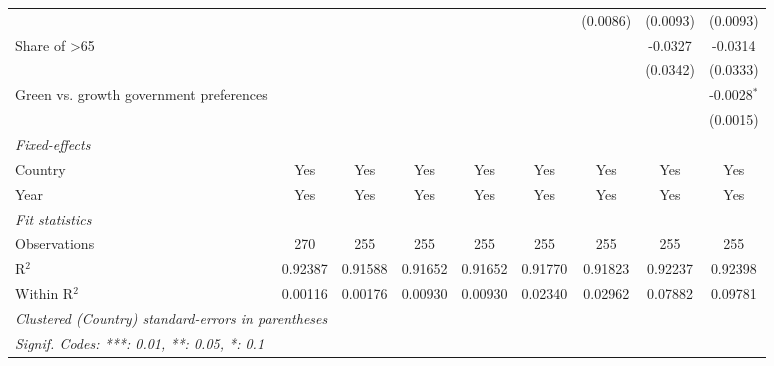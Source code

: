 \begin{table}[htbp]
\begin{tabular}{lcccccccc}
                                                       &          &          &          &          &          & (0.0086) & (0.0093) & (0.0093)\\   
      Share of >65                                     &          &          &          &          &          &          & -0.0327  & -0.0314\\   
                                                       &          &          &          &          &          &          & (0.0342) & (0.0333)\\   
      Green vs. growth government preferences          &          &          &          &          &          &          &          & -0.0028$^{*}$\\   
                                                       &          &          &          &          &          &          &          & (0.0015)\\   
      \midrule
      \emph{Fixed-effects}\\
      Country                                          & Yes      & Yes      & Yes      & Yes      & Yes      & Yes      & Yes      & Yes\\  
      Year                                             & Yes      & Yes      & Yes      & Yes      & Yes      & Yes      & Yes      & Yes\\  
      \midrule
      \emph{Fit statistics}\\
      Observations                                     & 270      & 255      & 255      & 255      & 255      & 255      & 255      & 255\\  
      R$^2$                                            & 0.92387  & 0.91588  & 0.91652  & 0.91652  & 0.91770  & 0.91823  & 0.92237  & 0.92398\\  
      Within R$^2$                                     & 0.00116  & 0.00176  & 0.00930  & 0.00930  & 0.02340  & 0.02962  & 0.07882  & 0.09781\\  
      \midrule \midrule
      \multicolumn{9}{l}{\emph{Clustered (Country) standard-errors in parentheses}}\\
      \multicolumn{9}{l}{\emph{Signif. Codes: ***: 0.01, **: 0.05, *: 0.1}}\\
   \end{tabular}
\end{table}


